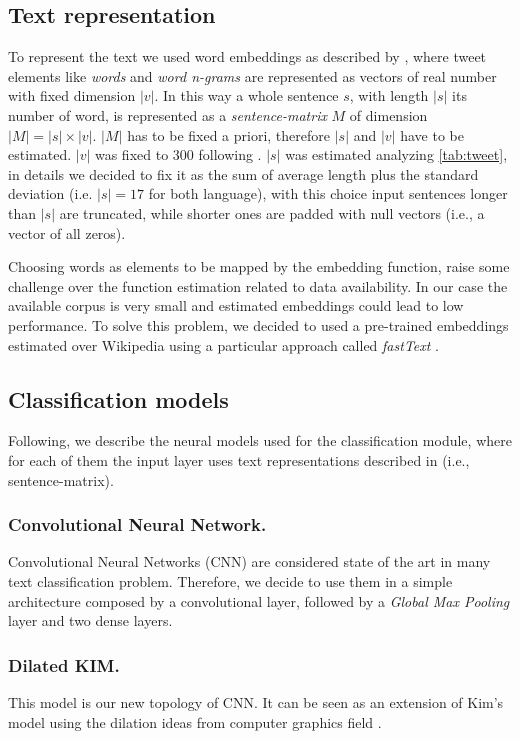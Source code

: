 \subsection{Text representation} \label{subsec:representation}
To represent the text we used word embeddings as described by \cite{bojanowski2016enriching}, where tweet elements like \emph{words} and \emph{word n-grams} are represented as vectors of real number with fixed dimension $|v|$.
In this way a whole sentence $s$, with length $|s|$ its number of word, is represented as a \emph{sentence-matrix} $M$ of dimension $|M| = |s| \times |v|$. $|M|$ has to be fixed a priori, therefore $|s|$ and $|v|$ have to be estimated. $|v|$ was fixed to 300 following \cite{bojanowski2016enriching}. $|s|$ was estimated analyzing \cref{tab:tweet}, in details we decided to fix it as the sum of average length plus the standard deviation (i.e. $|s| = 17$ for both language), with this choice input sentences longer than $|s|$ are truncated, while shorter ones are padded with null vectors (i.e., a vector of all zeros).

Choosing words as elements to be mapped by the embedding function, raise some challenge over the function estimation related to data availability. In our case the available corpus is very small and estimated embeddings could lead to low performance.
To solve this problem, we decided to used a pre-trained embeddings estimated over Wikipedia using a particular approach called \emph{fastText} \cite{bojanowski2016enriching}.


\subsection{Classification models} \label{subsec:classificationModel}
Following, we describe the neural models used for the classification module, where for each of them the input layer uses text representations described in  (i.e., sentence-matrix).


\subsubsection{Convolutional Neural Network.}
Convolutional Neural Networks (CNN) are considered state of the art in many text classification problem. Therefore, we decide to use them in a simple architecture composed by a convolutional layer, followed by a \emph{Global Max Pooling} layer and two dense layers.

\subsubsection{Dilated KIM.}
This model is our new topology of CNN. It can be seen as an extension of Kim's model \cite{kim2014convolutional} using the dilation ideas from computer graphics field \cite{yu2015multi}.

